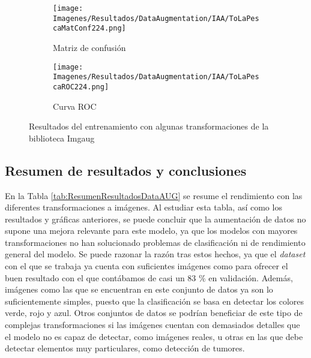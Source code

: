 \documentclass{report}
\begin{document}
\vspace{0.4cm}
\begin{figure}[H]
	 	\centering
	 	\begin{subfigure}[b]{0.45\linewidth}
	 	\centering
	 		\texttt{[image: Imagenes/Resultados/DataAugmentation/IAA/ToLaPescaMatConf224.png]}
	 		\caption{ Matriz de confusión }
                    \label{fig:DataAugmenEjIAAComple}
	 	\end{subfigure}
	 	\begin{subfigure}[b]{0.45\linewidth}
	 	\centering
	 		\texttt{[image: Imagenes/Resultados/DataAugmentation/IAA/ToLaPescaROC224.png]}
                    \caption{ Curva ROC }
                    \label{fig:DataAugmenEjIAAROC}
	 	\end{subfigure}
	 	\caption{ Resultados del entrenamiento con algunas transformaciones de la biblioteca Imgaug }
	 	\label{fig:DataAugmentationIAAeResults}
\end{figure}



\subsection{Resumen de resultados y conclusiones}


En la Tabla \ref{tab:ResumenResultadosDataAUG} se resume el rendimiento con las diferentes transformaciones a imágenes. Al estudiar esta tabla, así como los resultados y gráficas anteriores, se puede concluir que la aumentación de datos no supone una mejora relevante para este modelo, ya que los modelos con mayores transformaciones no han solucionado problemas de clasificación ni de rendimiento general del modelo. Se puede razonar la razón tras estos hechos, ya que el \textit{dataset} con el que se trabaja ya cuenta con suficientes imágenes como para ofrecer el buen resultado con el que contábamos de casi un 83 \% en validación. Además, imágenes como las que se encuentran en este conjunto de datos ya son lo suficientemente simples, puesto que la clasificación se basa en detectar los colores verde, rojo y azul. Otros conjuntos de datos se podrían beneficiar de este tipo de complejas transformaciones si las imágenes cuentan con demasiados detalles que el modelo no es capaz de detectar, como imágenes reales, u otras en las que debe detectar elementos muy particulares, como detección de tumores.
\end{document}
